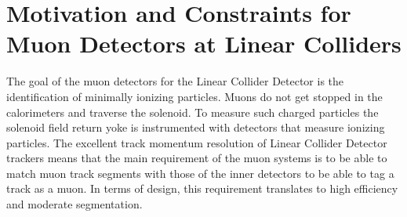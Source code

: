 \section{Motivation and Constraints for Muon Detectors at Linear Colliders}

The goal of the muon detectors for the Linear Collider Detector is the identification of minimally ionizing particles. Muons do not get stopped in the calorimeters and traverse the solenoid. To measure such charged particles the solenoid field return yoke is instrumented with detectors that measure ionizing particles. The excellent track momentum resolution of Linear Collider Detector trackers means that the main requirement of the muon systems is to be able to match muon track segments with those of the inner detectors to be able to tag a track as a muon. In terms of design, this requirement translates to high efficiency and moderate segmentation.

